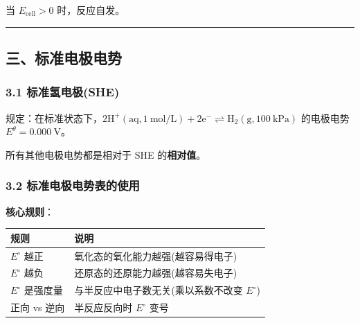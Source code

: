 \documentclass[a4paper,11pt]{ctexart}
\newcounter{none}
\begin{document}
当 \(E_{\text{cell}} > 0\) 时，反应自发。

\begin{center}\rule{0.5\linewidth}{0.5pt}\end{center}

\subsection{三、标准电极电势}\label{ux4e09ux6807ux51c6ux7535ux6781ux7535ux52bf}

\subsubsection{3.1 标准氢电极(SHE)}\label{ux6807ux51c6ux6c22ux7535ux6781she}

规定：在标准状态下，\(2\mathrm{H^+(aq, 1\ mol/L) + 2e^- \rightleftharpoons H_2(g, 100\ kPa)}\) 的电极电势 \(E^\theta = 0.000\ \mathrm{V}\)。

所有其他电极电势都是相对于 SHE 的\textbf{相对值}。

\subsubsection{3.2 标准电极电势表的使用}\label{ux6807ux51c6ux7535ux6781ux7535ux52bfux8868ux7684ux4f7fux7528}

\textbf{核心规则}：

{\def\LTcaptype{none} %
\begin{longtable}[]{@{}
  >{\raggedright\arraybackslash}p{}
  >{\raggedright\arraybackslash}p{}@{}}
\toprule\noalign{}
\begin{minipage}[b]{\linewidth}\raggedright
规则
\end{minipage} & \begin{minipage}[b]{\linewidth}\raggedright
说明
\end{minipage} \\
\midrule\noalign{}
\endhead
\bottomrule\noalign{}
\endlastfoot
\(E^{\circ}\) 越正 & 氧化态的氧化能力越强(越容易得电子) \\
\(E^{\circ}\) 越负 & 还原态的还原能力越强(越容易失电子) \\
\(E^{\circ}\) 是强度量 & 与半反应中电子数无关(乘以系数不改变 \(E^{\circ}\)) \\
正向 vs 逆向 & 半反应反向时 \(E^{\circ}\) 变号 \\
\end{longtable}
}
\end{document}
